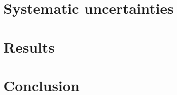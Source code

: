 \section{Systematic uncertainties}
\label{sec:Systs}


\section{Results}
\label{sec:result}



\FloatBarrier

\section{Conclusion}
\label{sec:conclusion}

